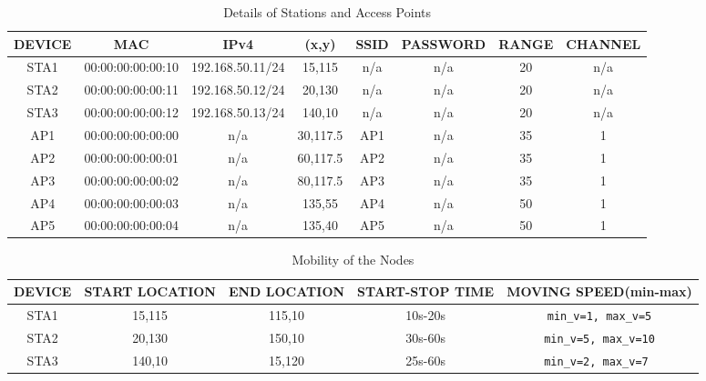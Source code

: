 \documentclass{article}
\begin{document}
\newpage
  	\begin{table}[h]
        		\centering
        		\begin{tabular}{|c|c|c|c|c|c|c|c|}
        			\hline
        			DEVICE & MAC & IPv4 & (x,y) & SSID & PASSWORD & RANGE & CHANNEL\\
        			\hline
        			STA1 & 00:00:00:00:00:10 & 192.168.50.11/24 & 15,115 & n/a & n/a & 20 & n/a \\
        			STA2 & 00:00:00:00:00:11 & 192.168.50.12/24 & 20,130 & n/a & n/a & 20 & n/a \\
       			STA3 & 00:00:00:00:00:12 & 192.168.50.13/24 & 140,10 & n/a & n/a & 20 & n/a \\
        			AP1 & 00:00:00:00:00:00 & n/a & 30,117.5 & AP1 & n/a & 35 & 1 \\
        			AP2 & 00:00:00:00:00:01 & n/a & 60,117.5 & AP2 & n/a & 35 & 1 \\
        			AP3 & 00:00:00:00:00:02 & n/a & 80,117.5 & AP3 & n/a & 35 & 1 \\
        			AP4 & 00:00:00:00:00:03 & n/a & 135,55 & AP4 & n/a & 50 & 1 \\
        			AP5 & 00:00:00:00:00:04 & n/a & 135,40 & AP5 & n/a & 50 & 1 \\
        			\hline
        		\end{tabular}
        \caption{Details of Stations and Access Points}
        \label{tab:1}
    	\end{table}
    	\begin{table}[h]
        		\centering
       		\begin{tabular}{|c|c|c|c|c|}
        			\hline
        			DEVICE & START LOCATION & END LOCATION & START-STOP TIME & MOVING SPEED(min-max)  \\
        			\hline
        			STA1 & 15,115 & 115,10 & 10s-20s & \texttt{min\_v=1, max\_v=5} \\
        			STA2 & 20,130 & 150,10 & 30s-60s & \texttt{min\_v=5, max\_v=10} \\
        			STA3 & 140,10 & 15,120 & 25s-60s & \texttt{min\_v=2, max\_v=7 }\\
        			\hline
        		\end{tabular}
        \caption{Mobility of the Nodes}
        \label{tab:2}
    	\end{table}
\end{document}

